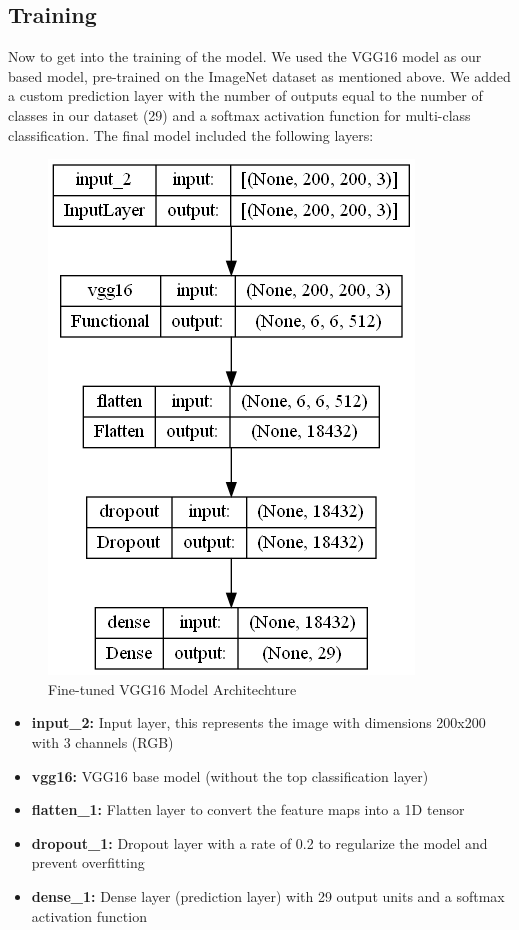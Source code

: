 \documentclass[12pt]{article}
\begin{document}
\subsection{Training}
Now to get into the training of the model. We used the VGG16 model as our based model, pre-trained on the ImageNet dataset as mentioned above. 
We added a custom prediction layer with the number of outputs equal to the number of classes in our dataset (29) and a softmax
activation function for multi-class classification. The final model included the following layers:\\
\begin{figure}[H]
    \centering
    \includegraphics*[scale=0.4]{images/model_plot.png}\\
    Fine-tuned VGG16 Model Architechture
\end{figure}
\begin{itemize}
    \item \textbf{input\_2:} Input layer, this represents the image with dimensions 200x200 with 3 channels (RGB)
    \item \textbf{vgg16:} VGG16 base model (without the top classification layer)
    \item \textbf{flatten\_1:} Flatten layer to convert the feature maps into a 1D tensor
    \item \textbf{dropout\_1:} Dropout layer with a rate of 0.2 to regularize the model and prevent overfitting
    \item \textbf{dense\_1:} Dense layer (prediction layer) with 29 output units and a softmax activation function
\end{itemize}
\end{document}
